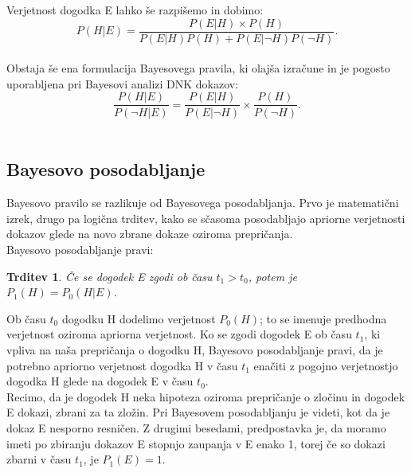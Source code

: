 \documentclass[12pt,a4paper]{amsart}
\theoremstyle{definition} %
\theoremstyle{plain} %
\newtheorem{trditev}[definicija]{Trditev}
\begin{document}
Verjetnost dogodka E lahko še razpišemo in dobimo:
\begin{equation}\label{eq:b_pravilo}
    P(H \lvert E) = \frac{P(E \lvert H) \times P(H)}{P(E \lvert H)P(H) + P(E \lvert \neg H)P(\neg H)}.
\end{equation} \\

Obstaja še ena formulacija Bayesovega pravila, ki olajša izračune in je pogosto uporabljena pri Bayesovi analizi DNK dokazov:
\begin{equation}\label{eq:b_pravilo_DNK}
    \frac{P(H \lvert E)}{P(\neg H \lvert E)} = \frac{P(E \lvert H)}{P(E \lvert \neg H)} \times \frac{P(H)}{P(\neg H)}.
\end{equation}\\

\subsection{Bayesovo posodabljanje}
Bayesovo pravilo se razlikuje od Bayesovega posodabljanja. Prvo je matematični izrek, drugo pa logična trditev, kako se sčasoma posodabljajo 
apriorne verjetnosti dokazov glede na novo zbrane dokaze oziroma prepričanja. \\

Bayesovo posodabljanje pravi:
\begin{trditev}
Če se dogodek E zgodi ob času $t_1 > t_0$, potem je $P_1(H) = P_0(H \lvert E)$.
\end{trditev}

Ob času $t_0$ dogodku H dodelimo verjetnost $P_0(H)$; to se imenuje predhodna verjetnost oziroma apriorna verjetnost. Ko se zgodi dogodek E 
ob času $t_1$, ki vpliva na naša prepričanja o dogodku H, Bayesovo posodabljanje pravi, da je potrebno apriorno verjetnost dogodka H v času $t_1$ 
enačiti z pogojno verjetnostjo dogodka H glede na dogodek E v času $t_0$. \\

Recimo, da je dogodek H neka hipoteza oziroma prepričanje o zločinu in dogodek E dokazi, zbrani za ta zložin. Pri Bayesovem posodabljanju je videti, 
kot da je dokaz E nesporno resničen. Z drugimi besedami, predpostavka je, da moramo imeti po zbiranju dokazov E stopnjo zaupanja v E enako 1, 
torej če so dokazi zbarni v času $t_1$, je $P_1(E)=1$. \\\\
\end{document}
